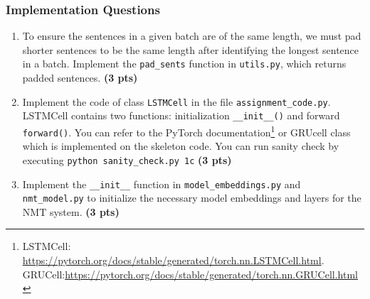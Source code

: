 \documentclass{assignment format}
\begin{document}
\subsubsection{Implementation Questions}

\begin{enumerate}[label=(\alph*)]

    \item To ensure the sentences in a given batch are of the same length, we must pad shorter sentences to be the same length after identifying the longest sentence in a batch. Implement the \texttt{pad\_sents} function in \texttt{utils.py}, which returns padded sentences. \textbf{(3 pts)}
    \item Implement the code of class \texttt{LSTMCell} in the file \texttt{assignment\_code.py}. LSTMCell contains two functions: initialization \texttt{\_\_init\_\_()} and forward \texttt{forward()}. You can refer to the PyTorch documentation\footnote{LSTMCell: \url{https://pytorch.org/docs/stable/generated/torch.nn.LSTMCell.html}. GRUCell:\url{https://pytorch.org/docs/stable/generated/torch.nn.GRUCell.html}} or GRUcell class which is implemented on the skeleton code. You can run sanity check by executing \texttt{python sanity\_check.py 1c} \textbf{(3 pts)}
   \item Implement the \texttt{\_\_init\_\_} function in \texttt{model\_embeddings.py} and \texttt{nmt\_model.py} to initialize the necessary model embeddings and layers for the NMT system. \textbf{(3 pts)}
   

\end{enumerate}
\end{document}
